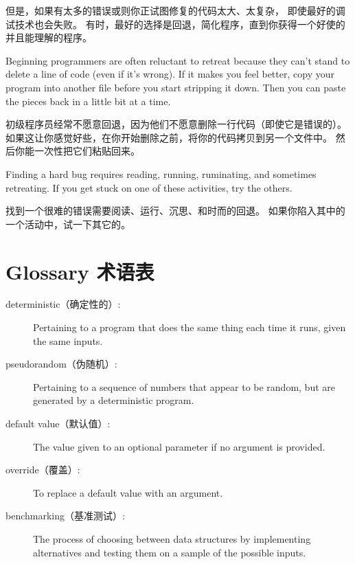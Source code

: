 \documentclass[10pt]{book}
\begin{document}
\begin{CJK}{UTF8}{gbsn}
但是，如果有太多的错误或则你正试图修复的代码太大、太复杂，
即使最好的调试技术也会失败。
有时，最好的选择是回退，简化程序，直到你获得一个好使的并且能理解的程序。

Beginning programmers are often reluctant to retreat because
they can't stand to delete a line of code (even if it's wrong).
If it makes you feel better, copy your program into another file
before you start stripping it down.  Then you can paste the pieces
back in a little bit at a time.

初级程序员经常不愿意回退，因为他们不愿意删除一行代码（即使它是错误的）。
如果这让你感觉好些，在你开始删除之前，将你的代码拷贝到另一个文件中。
然后你能一次性把它们粘贴回来。

Finding a hard bug requires reading, running, ruminating, and
sometimes retreating.  If you get stuck on one of these activities,
try the others.

找到一个很难的错误需要阅读、运行、沉思、和时而的回退。
如果你陷入其中的一个活动中，试一下其它的。

\section{Glossary 术语表}

\begin{description}

\item[deterministic（确定性的）:] Pertaining to a program that does the same
thing each time it runs, given the same inputs.

\item[pseudorandom（伪随机）:] Pertaining to a sequence of numbers that appear
to be random, but are generated by a deterministic program.

\item[default value（默认值）:] The value given to an optional parameter if no
argument is provided.

\item[override（覆盖）:] To replace a default value with an argument.

\item[benchmarking（基准测试）:] The process of choosing between data structures
by implementing alternatives and testing them on a sample of the
possible inputs.  

\end{description}



\end{CJK}
\end{document}
